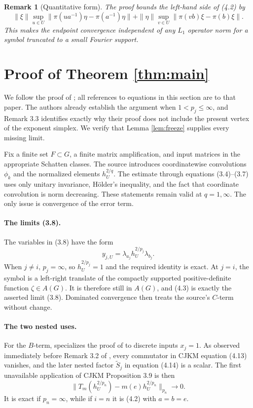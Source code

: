 \documentclass[11pt]{article}
\newtheorem{remark}[theorem]{Remark}
\begin{document}
\begin{remark}[Quantitative form]
The proof bounds the left-hand side of (4.2) by
\[
 \|\xi\|\sup_{u\in U}\|\pi(ua^{-1})\eta-\pi(a^{-1})\eta\|
 +\|\eta\|\sup_{v\in U}\|\pi(vb)\xi-\pi(b)\xi\|.
\]
This makes the endpoint convergence independent of any \(L_1\) operator norm
for a symbol truncated to a small Fourier support.
\end{remark}

\section{Proof of Theorem \ref{thm:main}}

We follow the proof of \cite[Theorem 3.1]{CKV}; all references to equations in
this section are to that paper.  The authors already establish the argument
when \(1<p_j\le\infty\), and Remark 3.3 identifies exactly why their proof
does not include the present vertex of the exponent simplex.  We verify that
Lemma \ref{lem:freeze} supplies every missing limit.

Fix a finite set \(F\subset G\), a finite matrix amplification, and input
matrices in the appropriate Schatten classes.  The source introduces
coordinatewise convolutions \(\phi_k\) and the normalized elements
\(h_U^{2/q}\).  The estimate through equations (3.4)--(3.7) uses only unitary
invariance, H\"older's inequality, and the fact that coordinate convolution
is norm decreasing.  These statements remain valid at \(q=1,\infty\).  The
only issue is convergence of the error term.

\paragraph{The limits (3.8).}
The variables in (3.8) have the form
\[
 y_{j,U}=\lambda_{a_j}h_U^{2/p_j}\lambda_{b_j}.
\]
When \(j\ne i\), \(p_j=\infty\), so \(h_U^{2/p_j}=1\) and the required
identity is exact.  At \(j=i\), the symbol is a left-right translate of the
compactly supported positive-definite function \(\zeta\in A(G)\).  It is
therefore still in \(A(G)\), and (4.3) is exactly the asserted limit (3.8).
Dominated convergence then treats the source's \(C\)-term without change.

\paragraph{The two nested uses.}
For the \(B\)-term, \cite{CKV} specializes the proof of
\cite[Lemma 4.6]{CJKM} to discrete inputs \(x_j=1\).  As observed immediately
before Remark 3.2 of \cite{CKV}, every commutator in CJKM equation (4.13)
vanishes, and the later nested factor \(\widetilde S_j\) in equation (4.14) is
a scalar.  The first unavailable application of CJKM Proposition 3.9 is then
\[
 \|T_m(h_U^{2/p_n})-m(e)h_U^{2/p_n}\|_{p_n}\longrightarrow0.       \tag{5.1}
\]
It is exact if \(p_n=\infty\), while if \(i=n\) it is (4.2) with
\(a=b=e\).
\end{document}
